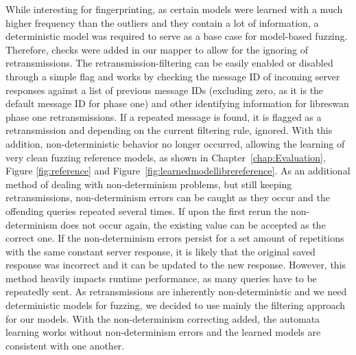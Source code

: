 While interesting for fingerprinting, as certain models were learned with a much higher frequency than the outliers and they contain a lot of information, a deterministic model was required to serve as a base case for model-based fuzzing. Therefore, checks were added in our mapper to allow for the ignoring of retransmissions. The retransmission-filtering can be easily enabled or disabled through a simple flag and works by checking the message ID of incoming server responses against a list of previous message IDs (excluding zero, as it is the default message ID for phase one) and other identifying information for libreswan phase one retransmissions. If a repeated message is found, it is flagged as a retransmission and depending on the current filtering rule, ignored. With this addition, non-deterministic behavior no longer occurred, allowing the learning of very clean fuzzing reference models, as shown in Chapter~\ref{chap:Evaluation}, Figure \ref{fig:reference} and Figure~\ref{fig:learnedmodellibrereference}. As an additional method of dealing with non-determinism problems, but still keeping retransmissions, non-determinism errors can be caught as they occur and the offending queries repeated several times. If upon the first rerun the non-determinism does not occur again, the existing value can be accepted as the correct one. If the non-determinism errors persist for a set amount of repetitions with the same constant server response, it is likely that the original saved response was incorrect and it can be updated to the new response. However, this method heavily impacts runtime performance, as many queries have to be repeatedly sent. As retransmissions are inherently non-deterministic and we need deterministic models for fuzzing, we decided to use mainly the filtering approach for our models. With the non-determinism correcting added, the automata learning works without non-determinism errors and the learned models are consistent with one another.
